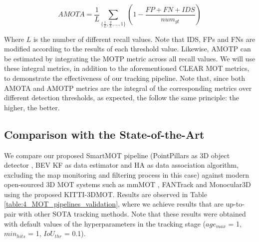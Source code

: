 \begin{equation}
	\label{eq:4_amota}
	AMOTA = \frac{1}{L}\sum_{\{\frac{1}{L},\frac{2}{L},...,1\}}(1-\frac{FP+FN+IDS}{num_{gt}})
\end{equation}

Where $L$ is the number of different recall values. Note that \ac{IDS}, \acp{FP} and \acp{FN} are modified according to the results of each threshold value. Likewise, \ac{AMOTP} can be estimated by integrating the \ac{MOTP} metric across all recall values. We will use these integral metrics, in addition to the aforementioned CLEAR \ac{MOT} metrics, to demonstrate the effectiveness of our tracking pipeline. Note that, since both \ac{AMOTA} and \ac{AMOTP} metrics are the integral of the corresponding metrics over different detection thresholds, as expected, the follow the same principle: the higher, the better.

\subsection{Comparison with the State-of-the-Art}
\label{subsec:4_mot_leaderboard}

We compare our proposed SmartMOT pipeline (PointPillars as 3D object detector \cite{lang2019pointpillars}, \ac{BEV} \ac{KF} as data estimator and \ac{HA} as data association algorithm, excluding the map monitoring and filtering process in this case) against modern open-sourced 3D MOT systems such as mmMOT \cite{zhang2019robust}, FANTrack \cite{baser2019fantrack} and Monocular3D \cite{weng2019monocular} using the proposed KITTI-3DMOT. Results are observed in Table \ref{table:4_MOT_pipelines_validation}, where we achieve results that are up-to-pair with other \ac{SOTA} tracking methods. Note that these results were obtained with default values of the hyperparameters in the tracking stage ($age_{max}$ = 1, $min_{hits}$ = 1, $IoU_{thr}$ = 0.1). 

